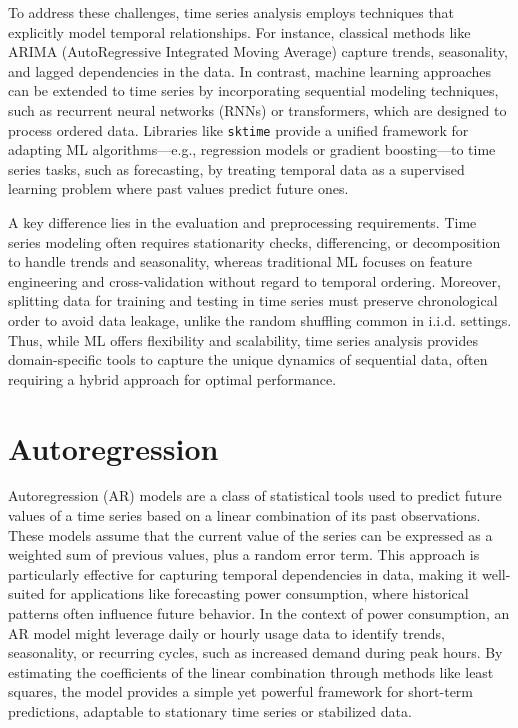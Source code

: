 	To address these challenges, time series analysis employs techniques that explicitly model temporal relationships. For instance, classical methods like ARIMA (AutoRegressive Integrated Moving Average) capture trends, seasonality, and lagged dependencies in the data. In contrast, machine learning approaches can be extended to time series by incorporating sequential modeling techniques, such as recurrent neural networks (RNNs) or transformers, which are designed to process ordered data. Libraries like \texttt{sktime} provide a unified framework for adapting ML algorithms—e.g., regression models or gradient boosting—to time series tasks, such as forecasting, by treating temporal data as a supervised learning problem where past values predict future ones. 
	
	A key difference lies in the evaluation and preprocessing requirements. Time series modeling often requires stationarity checks, differencing, or decomposition to handle trends and seasonality, whereas traditional ML focuses on feature engineering and cross-validation without regard to temporal ordering. Moreover, splitting data for training and testing in time series must preserve chronological order to avoid data leakage, unlike the random shuffling common in i.i.d. settings. Thus, while ML offers flexibility and scalability, time series analysis provides domain-specific tools to capture the unique dynamics of sequential data, often requiring a hybrid approach for optimal performance.

	\section{Autoregression}
	Autoregression (AR) models are a class of statistical tools used to predict future values of a time series based on a linear combination of its past observations. These models assume that the current value of the series can be expressed as a weighted sum of previous values, plus a random error term. This approach is particularly effective for capturing temporal dependencies in data, making it well-suited for applications like forecasting power consumption, where historical patterns often influence future behavior. In the context of power consumption, an AR model might leverage daily or hourly usage data to identify trends, seasonality, or recurring cycles, such as increased demand during peak hours. By estimating the coefficients of the linear combination through methods like least squares, the model provides a simple yet powerful framework for short-term predictions, adaptable to stationary time series or stabilized data.
	
